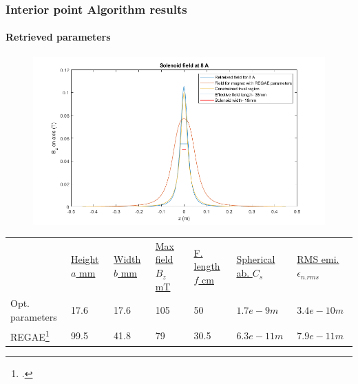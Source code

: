 \documentclass[10pt]{beamer}
\newcommand{\rfn}{\setcounter{footnote}{0}}
\begin{document}
\begin{frame}
  \frametitle{Interior point Algorithm results}
  \rfn
  \framesubtitle{Retrieved parameters}
    \begin{figure}
    \includegraphics[width=.8\textwidth]{retreivedBz.png}
  \end{figure}
    \begin{tiny}
    \begin{table}[t]
    \centering
    \begin{tabular}{    m{1.4cm}|| m{0.9cm}| m{0.9cm} | m{1.2cm}| m{1.1cm}| m{1.5cm}| m{1.5cm}}
    & \underline{Height $a$ mm} & \underline{Width $b$ mm}& \underline{Max field $ B_z$ mT}& \underline{F. length $f$ cm}& \underline{Spherical ab. $C_s$ }& \underline{RMS emi. $\epsilon_{n.rms}$ } \\
    Opt. parameters    &17.6 & 17.6 &105& 50   &$1.7e-9 m$   &$3.4e-10 m$\\
    REGAE\footcite{Disser} & 99.5 & 41.8&79  & 30.5&$6.3e-11 m$ &$7.9e-11 m$\\
  \end{tabular}
  \end{table}
    \end{tiny}
\end{frame}
\end{document}
